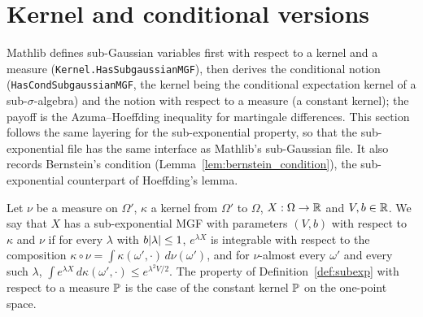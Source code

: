 \section{Kernel and conditional versions}
\label{sec:pre_subexp_kernel}

Mathlib defines sub-Gaussian variables first with respect to a kernel and a measure
(\texttt{Kernel.HasSubgaussianMGF}), then derives the conditional notion
(\texttt{HasCondSubgaussianMGF}, the kernel being the conditional expectation kernel of a
sub-$\sigma$-algebra) and the notion with respect to a measure (a constant kernel); the payoff
is the Azuma--Hoeffding inequality for martingale differences. This section follows the same
layering for the sub-exponential property, so that the sub-exponential file has the same
interface as Mathlib's sub-Gaussian file. It also records Bernstein's condition
(Lemma~\ref{lem:bernstein_condition}), the sub-exponential counterpart of Hoeffding's lemma.

\begin{definition}\label{def:subexp_kernel}
\leanok
{}
Let $\nu$ be a measure on $\Omega'$, $\kappa$ a kernel from $\Omega'$ to $\Omega$,
$X : \Omega \to \mathbb{R}$ and $V, b \in \mathbb{R}$. We say that $X$ has a sub-exponential MGF with
parameters $(V, b)$ with respect to $\kappa$ and $\nu$ if for every $\lambda$ with
$b\lvert \lambda \rvert \le 1$, $e^{\lambda X}$ is integrable with respect to the composition
$\kappa\circ\nu = \int\kappa(\omega',\cdot)\,d\nu(\omega')$, and for $\nu$-almost every
$\omega'$ and every such $\lambda$,
$\int e^{\lambda X}\,d\kappa(\omega',\cdot) \le e^{\lambda^2V/2}$.
The property of Definition~\ref{def:subexp} with respect to a measure $\mathbb{P}$ is the case of
the constant kernel $\mathbb{P}$ on the one-point space.
\end{definition}

